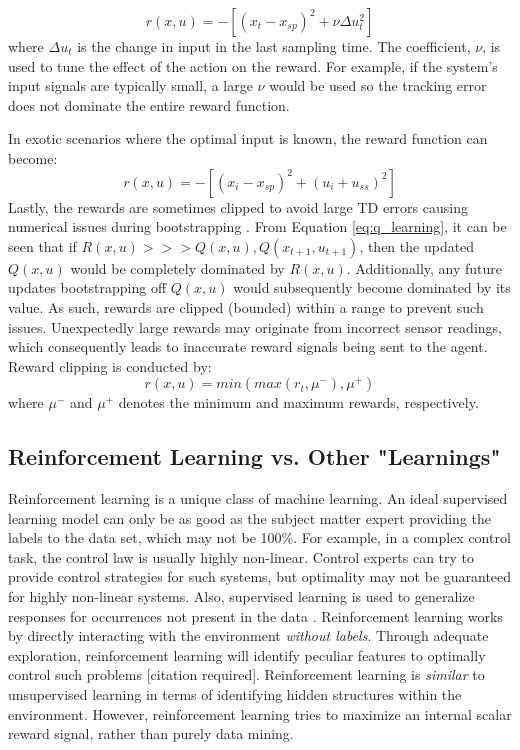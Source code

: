 \begin{equation}
    r(x, u) = -[(x_t - x_{sp})^2 + \nu \Delta u_t^2]
\end{equation}
where $\Delta u_t$ is the change in input in the last sampling time. The coefficient, $\nu$, is used to tune the effect of the action on the reward.  For example, if the system's input signals are typically small, a large $\nu$ would be used so the tracking error does not dominate the entire reward function.

In exotic scenarios where the optimal input is known, the reward function can become:
\begin{equation}
    r(x, u) = -[(x_i - x_{sp})^2 + (u_i + u_{ss})^2]
\end{equation}
Lastly, the rewards are sometimes clipped to avoid large TD errors causing numerical issues during bootstrapping \cite{reward_clip}.  From Equation \ref{eq:q_learning}, it can be seen that if $R(x, u) >>> Q(x, u), Q(x_{t+1}, u_{t+1})$, then the updated $Q(x, u)$ would be completely dominated by $R(x, u)$. Additionally, any future updates bootstrapping off $Q(x, u)$ would subsequently become dominated by its value. As such, rewards are clipped (bounded) within a range to prevent such issues. Unexpectedly large rewards may originate from incorrect sensor readings, which consequently leads to inaccurate reward signals being sent to the agent.  Reward clipping is conducted by:
\begin{equation}
    r(x, u) = min(max(r_t,\mu^- ), \mu^+)
    \label{reward_clipping}
\end{equation}
where $\mu^-$ and $\mu^+$ denotes the minimum and maximum rewards, respectively. 




\subsection{Reinforcement Learning vs. Other "Learnings"}

Reinforcement learning is a unique class of machine learning.  An ideal supervised learning model can only be as good as the subject matter expert providing the labels to the data set, which may not be 100\%.  For example, in a complex control task, the control law is usually highly non-linear. Control experts can try to provide control strategies for such systems, but optimality may not be guaranteed for highly non-linear systems. Also, supervised learning is used to generalize responses for occurrences not present in the data \cite{sutton}.  Reinforcement learning works by directly interacting with the environment \textit{without labels}. Through adequate exploration, reinforcement learning will identify peculiar features to optimally control such problems [citation required].  Reinforcement learning is \textit{similar} to unsupervised learning in terms of identifying hidden structures within the environment.  However, reinforcement learning tries to maximize an internal scalar reward signal, rather than purely data mining.

